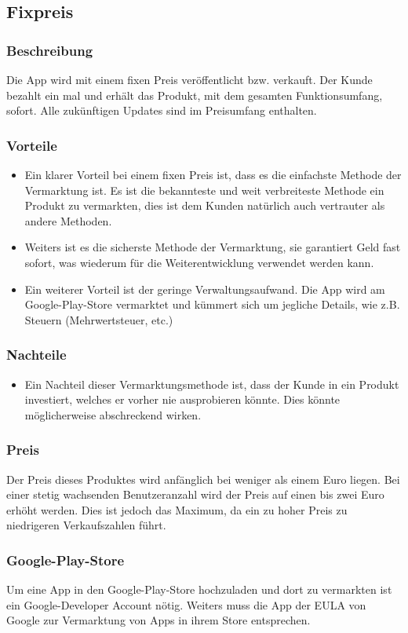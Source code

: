 \documentclass[FIPLY_base.tex]{subfiles}
\begin{document}
	
\subsection{Fixpreis}

\subsubsection{Beschreibung}
Die App wird mit einem fixen Preis veröffentlicht bzw. verkauft.
Der Kunde bezahlt ein mal und erhält das Produkt, mit dem gesamten Funktionsumfang, sofort.
Alle zukünftigen Updates sind im Preisumfang enthalten.

\subsubsection{Vorteile}
\begin{itemize}

\item Ein klarer Vorteil bei einem fixen Preis ist, dass es die einfachste Methode der Vermarktung ist.
Es ist die bekannteste und weit verbreiteste Methode ein Produkt zu vermarkten, dies ist dem Kunden natürlich auch vertrauter als andere Methoden.

\item Weiters ist es die sicherste Methode der Vermarktung, sie garantiert Geld fast sofort, was wiederum für die Weiterentwicklung verwendet werden kann.

\item Ein weiterer Vorteil ist der geringe Verwaltungsaufwand. Die App wird am Google-Play-Store vermarktet
und kümmert sich um jegliche Details, wie z.B. Steuern (Mehrwertsteuer, etc.)

\end{itemize}

\subsubsection{Nachteile}
\begin{itemize}
\item Ein Nachteil dieser Vermarktungsmethode ist, dass der Kunde in ein Produkt investiert, welches er vorher nie ausprobieren könnte.
Dies könnte möglicherweise abschreckend wirken.
\end{itemize}

\subsubsection{Preis}
Der Preis dieses Produktes wird anfänglich bei weniger als einem Euro liegen.
Bei einer stetig wachsenden Benutzeranzahl wird der Preis auf einen bis zwei Euro erhöht werden.
Dies ist jedoch das Maximum, da ein zu hoher Preis zu niedrigeren Verkaufszahlen führt.

\subsubsection{Google-Play-Store}
Um eine App in den Google-Play-Store hochzuladen und dort zu vermarkten ist ein Google-Developer Account nötig.
Weiters muss die App der EULA von Google zur Vermarktung von Apps in ihrem Store entsprechen.
\end{document}
